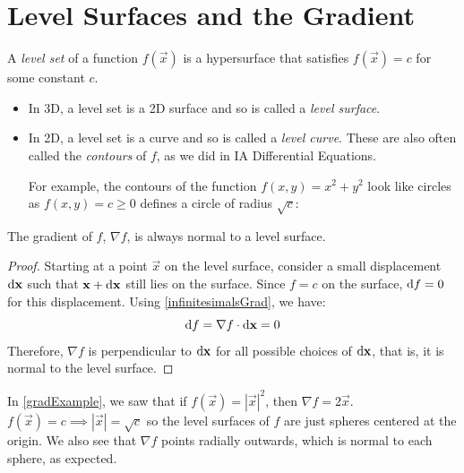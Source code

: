 \documentclass[../main.tex]{subfiles}
\begin{document}
\section{Level Surfaces and the Gradient}
\begin{definition}
  A \textit{level set} of a function $f(\vec{x})$ is a hypersurface that satisfies $f(\vec{x}) = c$ for some constant $c$.
\end{definition}
\begin{itemize}
  \item In 3D, a level set is a 2D surface and so is called a \textit{level surface}.
  \item In 2D, a level set is a curve and so is called a \textit{level curve}.
    These are also often called the \textit{contours} of $f$, as we did in IA Differential Equations.

    For example, the contours of the function $f(x, y) = x^2 + y^2$ look like circles as $f(x, y) = c \geq 0$ defines a circle of radius $\sqrt{c}$:
    \begin{center}
    \end{center}
\end{itemize}
\begin{proposition}
  The gradient of $f$, $\nabla f$, is always normal to a level surface.
\end{proposition}
\begin{proof}
  Starting at a point $\vec{x}$ on the level surface, consider a small displacement $\d{\vec{x}}$ such that $\vec{x} + \d{\vec{x}}$ still lies on the surface.
  Since $f = c$ on the surface, $\d{f} = 0$ for this displacement.
  Using \cref{infinitesimalsGrad}, we have:
  \[
    \d{f} = \nabla f \cdot \d{\vec{x}} = 0
  \]
  Therefore, $\nabla f$ is perpendicular to $\d{\vec{x}}$ for all possible choices of $\d{\vec{x}}$, that is, it is normal to the level surface.
\end{proof}
\begin{example}
  In \cref{gradExample}, we saw that if $f(\vec{x}) = |\vec{x}|^2$, then $\nabla f = 2\vec{x}$.
  $f(\vec{x}) = c \implies |\vec{x}| = \sqrt{c}$ so the level surfaces of $f$ are just spheres centered at the origin.
  We also see that $\nabla f$ points radially outwards, which is normal to each sphere, as expected.
\end{example}
\end{document}
